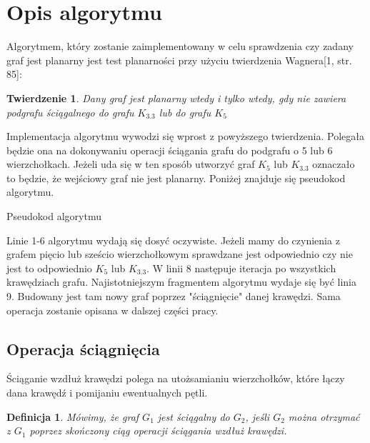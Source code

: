 \documentclass[a4 122pt]{article}
\newtheorem{twierdzenie}{Twierdzenie}
\newtheorem{definicja}{Definicja}
\newenvironment{algorytm}[1][htb]
  {\renewcommand{\algorithmcfname}{Algorytm}%
   \begin{algorithm}[#1]%
  }{\end{algorithm}}
\begin{document}
	\pagebreak

	\section{Opis algorytmu}	
	Algorytmem, który zostanie zaimplementowany w celu sprawdzenia czy zadany graf jest planarny jest test planarności przy użyciu twierdzenia Wagnera[1, str. 85]:
	\begin{twierdzenie}
	Dany graf jest planarny wtedy i tylko wtedy, gdy nie zawiera podgrafu ściągalnego do grafu $K_{3.3}$ lub do grafu $ K_5 $
	\end{twierdzenie}
	Implementacja algorytmu wywodzi się wprost z powyższego twierdzenia. 
	Polegała będzie ona na dokonywaniu operacji ściągania grafu do podgrafu o 5 lub 6 wierzchołkach.
	Jeżeli uda się w ten sposób utworzyć graf $ K_5 $ lub $K_{3.3}$ oznaczało to będzie, że wejściowy graf nie jest planarny.
	Poniżej znajduje się pseudokod algorytmu.
	
	\begin{algorytm}[H]
	\newcommand{\forcond}{$i=0$ \KwTo $n$}
	\caption{Pseudokod algorytmu}
	\end{algorytm}
	
	Linie 1-6 algorytmu wydają się dosyć oczywiste. 
	Jeżeli mamy do czynienia z grafem pięcio lub sześcio wierzchołkowym sprawdzane jest odpowiednio czy nie jest to odpowiednio $K_5$ lub $K_{3.3}$. 
	W linii 8 następuje iteracja po wszystkich krawędziach grafu. 
	Najistotniejszym fragmentem algorytmu wydaje się być linia 9. 
	Budowany jest tam nowy graf poprzez "ściągnięcie" danej krawędzi. 
	Sama operacja zostanie opisana w dalszej części pracy.
	
	\subsection{Operacja ściągnięcia}
		Ściąganie wzdłuż krawędzi polega na utożsamianiu wierzchołków, które łączy dana krawędź i pomijaniu ewentualnych pętli. 
 		
		\begin{definicja}
			Mówimy, że graf $G_1$ jest ściągalny do $G_2$, jeśli $G_2$ można otrzymać z $G_1$ poprzez skończony ciąg operacji ściągania wzdłuż krawędzi.
		\end{definicja}
		
\end{document}
